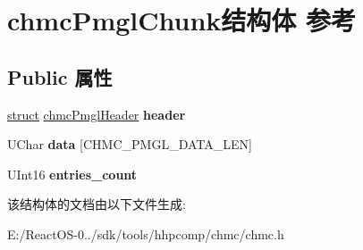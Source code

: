 \hypertarget{structchmc_pmgl_chunk}{}\section{chmc\+Pmgl\+Chunk结构体 参考}
\label{structchmc_pmgl_chunk}
\subsection*{Public 属性}
\begin{DoxyCompactItemize}
\item 
\mbox{\label{structchmc_pmgl_chunk_a70538230baf2ec734863162971df4935}} 
\hyperlink{interfacestruct}{struct} \hyperlink{structchmc_pmgl_header}{chmc\+Pmgl\+Header} {\bfseries header}
\item 
\mbox{\label{structchmc_pmgl_chunk_a75e3fadd2fa8ff4a4e36796cf5055d54}} 
U\+Char {\bfseries data} \mbox{[}C\+H\+M\+C\+\_\+\+P\+M\+G\+L\+\_\+\+D\+A\+T\+A\+\_\+\+L\+EN\mbox{]}
\item 
\mbox{\label{structchmc_pmgl_chunk_ab5db50a768ef9655673238bcaf4812e3}} 
U\+Int16 {\bfseries entries\+\_\+count}
\end{DoxyCompactItemize}


该结构体的文档由以下文件生成\+:\begin{DoxyCompactItemize}
\item 
E\+:/\+React\+O\+S-\/0../sdk/tools/hhpcomp/chmc/chmc.\+h\end{DoxyCompactItemize}
